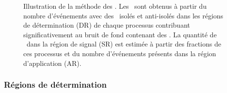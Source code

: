 \begin{figure}[h]
\centering

\caption[Illustration de la méthode des \fakefactors.]{Illustration de la méthode des \fakefactors. Les \fakefactors\ sont obtenus à partir du nombre d'événements avec des \tauh\ isolés et anti-isolés dans les régions de détermination (DR) de chaque processus contribuant significativement au bruit de fond contenant des \ftauhs. La quantité de \ftauhs\ dans la région de signal (SR) est estimée à partir des fractions de ces processus et du nombre d'événements présents dans la région d'application (AR).}
\label{fig-chapter-HTT_analysis-section-bg_estimation-FF_method-ppe}
\end{figure}
\subsubsection{Régions de détermination}
